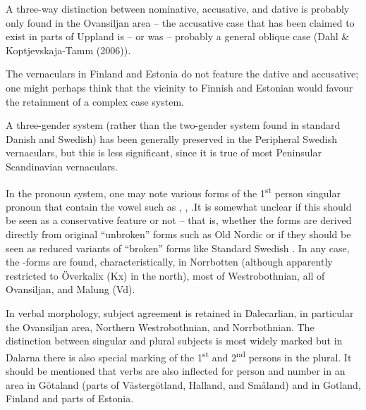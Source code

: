 A three-way distinction between nominative, accusative, and dative is probably only found in the Ovansiljan area – the accusative case that has been claimed to exist in parts of Uppland is – or was – probably a general oblique case (Dahl \& Koptjevskaja-Tamm (2006)). 

The vernaculars in Finland and Estonia do not feature the dative and accusative; one might perhaps think that the vicinity to Finnish and Estonian would favour the retainment of a complex case system. 

A three-gender system (rather than the two-gender system found in standard Danish and Swedish) has been generally preserved in the Peripheral Swedish vernaculars, but this is less significant, since it is true of most Peninsular Scandinavian vernaculars. 

In the pronoun system, one may note various forms of the 1\textsuperscript{st} person singular pronoun that contain the vowel such as , , .\textstyleLinguisticExample{ }It is somewhat unclear if this should be seen as a conservative feature or not – that is, whether the forms are derived directly from original “unbroken” forms such as Old Nordic or if they should be seen as reduced variants of “broken” forms like Standard Swedish . In any case, the -forms are found, characteristically, in Norrbotten (although apparently restricted to Överkalix (Kx) in the north), most of Westrobothnian, all of Ovansiljan, and Malung (Vd). 

In verbal morphology, subject agreement is retained in Dalecarlian, in particular the Ovansiljan area, Northern Westrobothnian, and Norrbothnian. The distinction between singular and plural subjects is most widely marked but in Dalarna there is also special marking of the 1\textsuperscript{st} and 2\textsuperscript{nd} persons in the plural. It should be mentioned that verbs are also inflected for person and number in an area in Götaland (parts of Västergötland, Halland, and Småland) and in Gotland, Finland and parts of Estonia.

